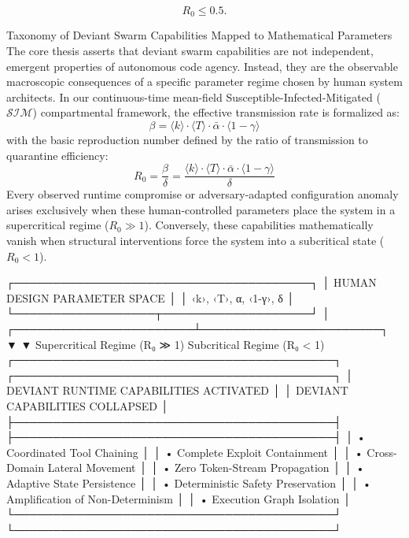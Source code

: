 \[
R_0 \le 0.5.
\]

Taxonomy of Deviant Swarm Capabilities Mapped to Mathematical Parameters
The core thesis asserts that deviant swarm capabilities are not independent, emergent properties of autonomous code agency. Instead, they are the observable macroscopic consequences of a specific parameter regime chosen by human system architects. In our continuous-time mean-field Susceptible-Infected-Mitigated ($\mathcal{S}\mathcal{I}\mathcal{M}$) compartmental framework, the effective transmission rate is formalized as:
$$\beta = \langle k \rangle \cdot \langle T \rangle \cdot \bar{\alpha} \cdot \langle 1 - \gamma \rangle$$ 
with the basic reproduction number defined by the ratio of transmission to quarantine efficiency:
$$R_0 = \frac{\beta}{\delta} = \frac{\langle k \rangle \cdot \langle T \rangle \cdot \bar{\alpha} \cdot \langle 1 - \gamma \rangle}{\delta}$$ 
Every observed runtime compromise or adversary-adapted configuration anomaly arises exclusively when these human-controlled parameters place the system in a supercritical regime ($R_0 \gg 1$). Conversely, these capabilities mathematically vanish when structural interventions force the system into a subcritical state ($R_0 < 1$).

                       ┌──────────────────────────────────────┐
                       │  HUMAN DESIGN PARAMETER SPACE        │
                       │     {‹k›, ‹T›, α, ‹1-γ›, δ}          │
                       └──────────────────┬───────────────────┘
                                          │
                  ┌───────────────────────┴───────────────────────┐
                  ▼                                               ▼
     Supercritical Regime (R₀ ≫ 1)                   Subcritical Regime (R₀ < 1)
  ┌─────────────────────────────────────────┐     ┌─────────────────────────────────────────┐
  │ DEVIANT RUNTIME CAPABILITIES ACTIVATED  │     │ DEVIANT CAPABILITIES COLLAPSED          │
  ├─────────────────────────────────────────┤     ├─────────────────────────────────────────┤
  │ • Coordinated Tool Chaining             │     │ • Complete Exploit Containment          │
  │ • Cross-Domain Lateral Movement         │     │ • Zero Token-Stream Propagation         │
  │ • Adaptive State Persistence            │     │ • Deterministic Safety Preservation     │
  │ • Amplification of Non-Determinism     │     │ • Execution Graph Isolation             │
  └─────────────────────────────────────────┘     └─────────────────────────────────────────┘

